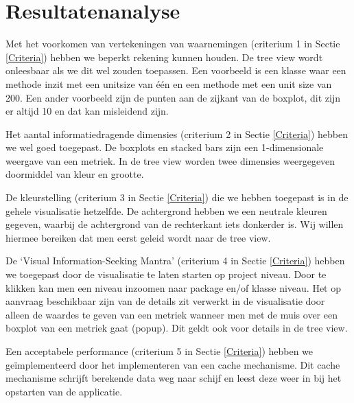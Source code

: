 \documentclass[a4paper]{article}
\begin{document}
\section{Resultatenanalyse}
Met het voorkomen van vertekeningen van waarnemingen (criterium 1 in Sectie \ref{Criteria}) hebben we beperkt rekening kunnen houden. De tree view wordt onleesbaar als we dit wel zouden toepassen. Een voorbeeld is een klasse waar een methode inzit met een unitsize van één en een methode met een unit size van 200.
Een ander voorbeeld zijn de punten aan de zijkant van de boxplot, dit zijn er altijd 10 en dat kan misleidend zijn.

Het aantal informatiedragende dimensies (criterium 2 in Sectie \ref{Criteria}) hebben we wel goed toegepast. De boxplots en stacked bars zijn een 1-dimensionale weergave van een metriek. In de tree view worden twee dimensies weergegeven doormiddel van kleur en grootte. 

De kleurstelling (criterium 3 in Sectie \ref{Criteria}) die we hebben toegepast is in de gehele visualisatie hetzelfde.  De achtergrond hebben we een neutrale kleuren gegeven, waarbij de achtergrond van de rechterkant iets donkerder is. Wij willen hiermee bereiken dat men eerst geleid wordt naar de tree view.

De `Visual Information-Seeking Mantra' (criterium 4 in Sectie \ref{Criteria}) hebben we toegepast door de visualisatie te laten starten op project niveau. Door te klikken kan men een niveau inzoomen naar package en/of klasse niveau. Het op aanvraag beschikbaar zijn van de details zit verwerkt in de visualisatie door alleen de waardes te geven van een metriek wanneer men met de muis over een boxplot van een metriek gaat (popup). Dit geldt ook voor details in de tree view.

Een acceptabele performance (criterium 5 in Sectie \ref{Criteria}) hebben we geïmplementeerd door het implementeren van een cache mechanisme. Dit cache mechanisme \mbox{schrijft} berekende data weg naar schijf en leest deze weer in bij het opstarten van de applicatie.



\end{document}
